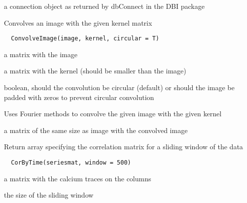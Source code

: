 \documentclass[a4paper]{book}
\begin{document}
%
\begin{Value}
a connection object as returned by dbConnect in the DBI
package
\end{Value}
%
\begin{Description}\relax
Convolves an image with the given kernel matrix
\end{Description}
%
\begin{Usage}
\begin{verbatim}
  ConvolveImage(image, kernel, circular = T)
\end{verbatim}
\end{Usage}
%
\begin{Arguments}
\begin{ldescription}
\item[\code{image}] a matrix with the image

\item[\code{kernel}] a matrix with the kernel (should be smaller
than the image)

\item[\code{circular}] boolean, should the convolution be
circular (default) or should the image be padded with
zeros to prevent circular convolution
\end{ldescription}
\end{Arguments}
%
\begin{Details}\relax
Uses Fourier methods to convolve the given image with the
given kernel
\end{Details}
%
\begin{Value}
a matrix of the same size as image with the convolved
image
\end{Value}
%
\begin{Description}\relax
Return array specifying the correlation matrix for a
sliding window of the data
\end{Description}
%
\begin{Usage}
\begin{verbatim}
  CorByTime(seriesmat, window = 500)
\end{verbatim}
\end{Usage}
%
\begin{Arguments}
\begin{ldescription}
\item[\code{seriesmat}] a matrix with the calcium traces on the
columns

\item[\code{window}] the size of the sliding window
\end{ldescription}
\end{Arguments}
\end{document}
